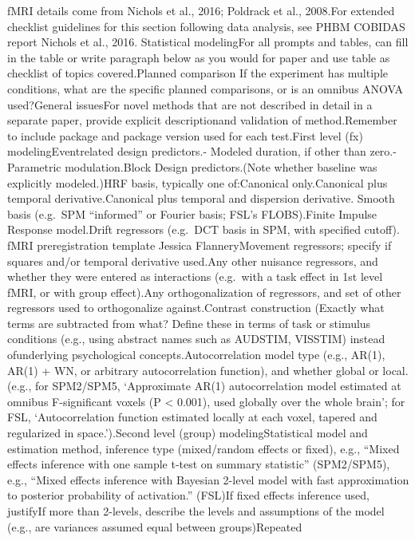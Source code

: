 \documentclass[]{article}
\begin{document}
fMRI details come from Nichols et al., 2016; Poldrack et al., 2008.For
extended checklist guidelines for this section following data analysis,
see PHBM COBIDAS report Nichols et al., 2016. Statistical modelingFor
all prompts and tables, can fill in the table or write paragraph below
as you would for paper and use table as checklist of topics
covered.Planned comparison If the experiment has multiple conditions,
what are the specific planned comparisons, or is an omnibus ANOVA
used?General issuesFor novel methods that are not described in detail in
a separate paper, provide explicit descriptionand validation of
method.Remember to include package and package version used for each
test.First level (fx) modelingEventrelated design predictors.- Modeled
duration, if other than zero.- Parametric modulation.Block Design
predictors.(Note whether baseline was explicitly modeled.)HRF basis,
typically one of:Canonical only.Canonical plus temporal
derivative.Canonical plus temporal and dispersion derivative. Smooth
basis (e.g.~SPM ``informed'' or Fourier basis; FSL's FLOBS).Finite
Impulse Response model.Drift regressors (e.g.~DCT basis in SPM, with
specified cutoff). fMRI preregistration template \textbar{} Jessica
FlanneryMovement regressors; specify if squares and/or temporal
derivative used.Any other nuisance regressors, and whether they were
entered as interactions (e.g.~with a task effect in 1st level fMRI, or
with group effect).Any orthogonalization of regressors, and set of other
regressors used to orthogonalize against.Contrast construction (Exactly
what terms are subtracted from what? Define these in terms of task or
stimulus conditions (e.g., using abstract names such as AUDSTIM,
VISSTIM) instead ofunderlying psychological concepts.Autocorrelation
model type (e.g., AR(1), AR(1) + WN, or arbitrary autocorrelation
function), and whether global or local.(e.g., for SPM2/SPM5,
`Approximate AR(1) autocorrelation model estimated at omnibus
F-significant voxels (P \textless{} 0.001), used globally over the whole
brain'; for FSL, `Autocorrelation function estimated locally at each
voxel, tapered and regularized in space.').Second level (group)
modelingStatistical model and estimation method, inference type
(mixed/random effects or fixed), e.g., ``Mixed effects inference with
one sample t-test on summary statistic'' (SPM2/SPM5), e.g., ``Mixed
effects inference with Bayesian 2-level model with fast approximation to
posterior probability of activation.'' (FSL)If fixed effects inference
used, justifyIf more than 2-levels, describe the levels and assumptions
of the model (e.g., are variances assumed equal between groups)Repeated
\end{document}
